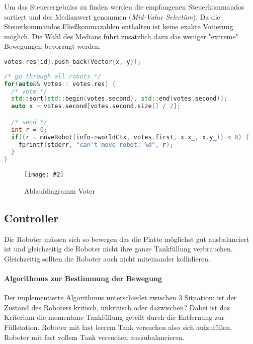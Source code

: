 \documentclass[
    12pt,
    bibliography=totoc,
    ngerman,
	enabledeprecatedfontcommands
]{scrartcl}
\newcommand{\includevisio}[2][]{\texttt{[image: \#2]}}
\begin{document}
{Um das Steuerergebniss zu finden werden die empfangenen Steuerkommandos sortiert und der Medianwert genommen (\textit{Mid-Value Selection}). Da die Steuerkommandos
Flie{\ss}kommazahlen enthalten ist keine exakte Votierung m{\"{o}}glich. Die Wahl des Medians f{\"{u}}hrt zus{\"{a}}tzlich dazu das weniger "extreme" Bewegungen bevorzugt werden.
\noindent\begin{minipage}{.30\textwidth}
\begin{lstlisting}[caption=Sammeln, frame=tlrb, language=c++]
votes.res[id].push_back(Vector{x, y});
\end{lstlisting}
\end{minipage}\hfill
\begin{minipage}{.60\textwidth}
\begin{lstlisting}[caption=Auswahl, frame=tlrb, language=c++]
/* go through all robots */
for(auto&& votes : votes.res) {
  /* vote */
  std::sort(std::begin(votes.second), std::end(votes.second));
  auto x = votes.second[votes.second.size() / 2];

  /* send */
  int r = 0;
  if((r = moveRobot(info->worldCtx, votes.first, x.x_, x.y_)) < 0) {
  	fprintf(stderr, "can't move robot: %d", r);
  }
}
\end{lstlisting}
\end{minipage}


\begin{figure}
	\centering
	\includevisio[width=\textwidth]{seqvoter}
	\caption{Ablaufdiagramm Voter}
	\label{fig:sequence-voter}
\end{figure}
\clearpage %

\subsection{Controller}\label{controller}
Die Roboter m{\"{u}}ssen sich so bewegen das die Platte m{\"{o}}glichst gut ausbalanciert
ist und gleichzeitig die Roboter nicht ihre ganze Tankf{\"{u}}llung verbrauchen. Gleichzeitig sollten die Roboter auch nicht miteinander
kollidieren.

\paragraph{Algorithmus zur Bestimmung der Bewegung} Der implementierte Algorithmus unterschiedet zwischen 3 Situation: ist der Zustand des Roboters kritisch,
unkritisch oder dazwischen? Dabei ist das Kriterium die momentane Tankf{\"{u}}llung geteilt durch die Entfernung zur F{\"{u}}llstation. Roboter mit fast leerem Tank
versuchen also sich aufzuf{\"{u}}llen, Roboter mit fast vollem Tank versuchen auszubalancieren.

}
\end{document}
